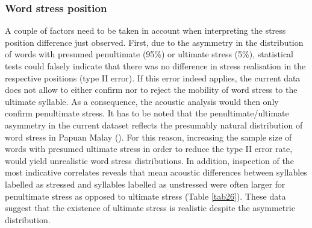 \subsubsection{Word stress position}
A couple of factors need to be taken in account when interpreting the stress position difference just observed. First, due to the asymmetry in the distribution of words with presumed penultimate (95\%) or ultimate stress (5\%), statistical tests could falsely indicate that there was no difference in stress realisation in the respective positions (type II error). If this error indeed applies, the current data does not allow to either confirm nor to reject the mobility of word stress to the ultimate syllable. As a consequence, the acoustic analysis would then only confirm penultimate stress. It has to be noted that the penultimate/ultimate asymmetry in the current dataset reflects the presumably natural distribution of word stress in Papuan Malay (\citealt{kluge_grammar_2017}). For this reason, increasing the sample size of words with presumed ultimate stress in order to reduce the type II error rate, would yield unrealistic word stress distributions. In addition, inspection of the most indicative correlates reveals that mean acoustic differences between syllables labelled as stressed and syllables labelled as unstressed were often larger for penultimate stress as opposed to ultimate stress (Table \ref{tab26}). These data suggest that the existence of ultimate stress is realistic despite the asymmetric distribution.\par

